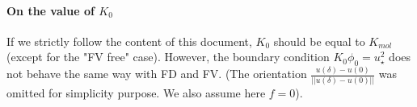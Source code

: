 \paragraph{On the value of $K_0$}
\label{sec:ND_StratifiedCase_viscosity0_FVpure}
If we strictly follow the content of this document,
$K_0$ should be equal to $K_{mol}$ (except for the "FV free" case).
However, the boundary condition $K_0 \phi_0 = u_\star^2$
does not behave the same way with FD and FV.
(The orientation $\frac{u(\delta)-u(0)}{||u(\delta)-u(0)||}$
was omitted for simplicity purpose. We also assume here $f=0$).

